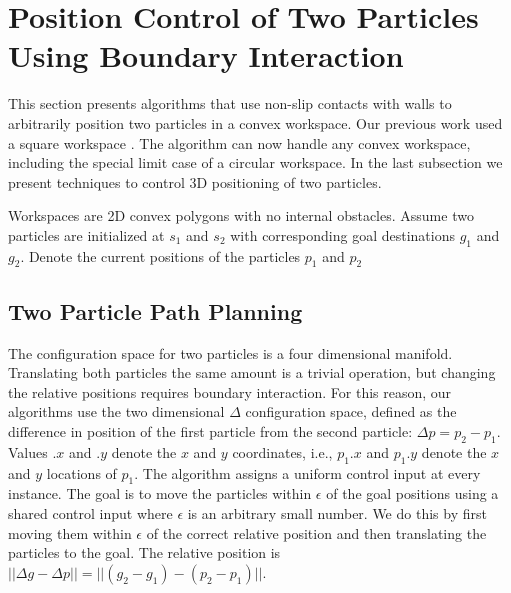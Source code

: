 

\section{Position Control of Two Particles Using Boundary Interaction}\label{sec:PostionControl2Robots}

This section presents algorithms that use non-slip contacts with walls to arbitrarily position two particles in a convex workspace. Our previous work used a square workspace \cite{shahrokhi2017algorithms}. The algorithm can now handle any convex workspace, including the special limit case of a circular workspace. In the last subsection we present techniques to control 3D positioning of two particles.

Workspaces are 2D convex polygons with no internal obstacles. 
 Assume two particles are initialized at $s_1$ and $s_2$ with corresponding goal destinations $g_1$ and $g_2$. 
Denote the current positions of the particles  $p_1$ and $p_2$ 



\subsection{Two Particle Path Planning}


The configuration space for two particles is a four dimensional manifold. Translating both particles the same amount is a trivial operation, but changing the relative positions requires boundary interaction. For this reason, our algorithms use the two dimensional $\Delta$ configuration space, defined as the difference in position of the first particle from the second particle: $\Delta p = p_2 - p_1$.
 Values $.x$ and $.y$ denote the $x$ and $y$ coordinates, i.e., $p_1.x$ and $p_1.y$ denote the $x$ and $y$ locations of $p_1$. 
The algorithm assigns a uniform control input at every instance.
The goal is to move the particles within $\epsilon$ of the goal positions using a shared control input where $\epsilon$ is an arbitrary small number. We do this by first moving them within $\epsilon$ of the correct relative position and then translating the particles to the goal. The relative position is $||\Delta g - \Delta p || = ||(g_2-g_1)- (p_2-p_1)||$.  
 
